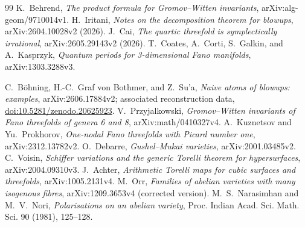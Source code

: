 \documentclass[11pt]{article}
\numberwithin{equation}{section}
\theoremstyle{definition}
\theoremstyle{remark}
\begin{document}
\begin{thebibliography}{99}
K.~Behrend, \emph{The product formula for Gromov--Witten invariants},
arXiv:alg-geom/9710014v1.
H.~Iritani, \emph{Notes on the decomposition theorem for blowups},
arXiv:2604.10028v2 (2026).
J.~Cai, \emph{The quartic threefold is symplectically irrational},
arXiv:2605.29143v2 (2026).
T.~Coates, A.~Corti, S.~Galkin, and A.~Kasprzyk,
\emph{Quantum periods for 3-dimensional Fano manifolds},
arXiv:1303.3288v3.
\begingroup\raggedright
{}
C.~B\"ohning, H.-C.~Graf von Bothmer, and Z.~Su'a,
\emph{Naive atoms of blowups: examples}, arXiv:2606.17884v2;
associated reconstruction data, \href{https://doi.org/10.5281/zenodo.20625923}{doi:10.5281/zenodo.20625923}.
V.~Przyjalkowski, \emph{Gromov--Witten invariants of Fano threefolds of
genera 6 and 8}, arXiv:math/0410327v4.
A.~Kuznetsov and Yu.~Prokhorov, \emph{One-nodal Fano threefolds with Picard
number one}, arXiv:2312.13782v2.
O.~Debarre, \emph{Gushel--Mukai varieties}, arXiv:2001.03485v2.
C.~Voisin, \emph{Schiffer variations and the generic Torelli theorem for
hypersurfaces}, arXiv:2004.09310v3.
J.~Achter, \emph{Arithmetic Torelli maps for cubic surfaces and threefolds},
arXiv:1005.2131v4.
M.~Orr, \emph{Families of abelian varieties with many isogenous fibres},
arXiv:1209.3653v4 (corrected version).
M.~S.~Narasimhan and M.~V.~Nori, \emph{Polarisations on an abelian variety},
Proc. Indian Acad. Sci. Math. Sci. 90 (1981), 125--128.

\par\endgroup
\end{thebibliography}
\end{document}

